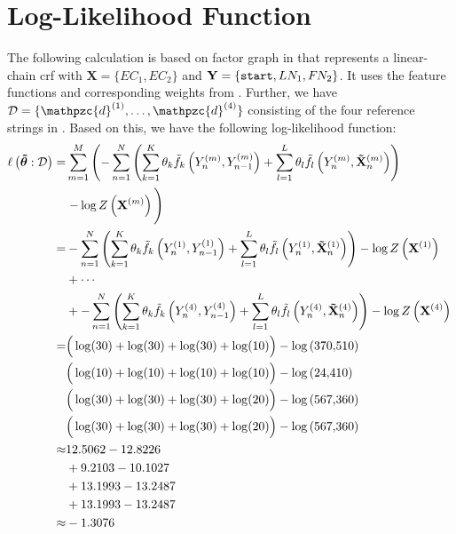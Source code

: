\section{Log-Likelihood Function}\label{app:sec-log-likelihood-function}
The following calculation is based on \gls{factor graph} in  that represents a \gls{linear-chain crf} with $\mathbf{X}=\{EC_1,EC_2\}$ and $\mathbf{Y}=\{\texttt{start},LN_1,F\hspace{-0.07em} N_2\}$.
It uses the \glspl{feature function} and corresponding weights from .
Further, we have $\mathcal{D}=\{\mathpzc{d}^{(1)},\dots,\mathpzc{d}^{(4)}\}$ consisting of the four reference strings in .
Based on this, we have the following log-likelihood function:
\begin{equation*}
  \begin{split}
    \ell\left(\bm{\tilde{\theta}}:\mathcal{D}\right) = & \sum_{m=1}^M \left(-\sum_{n=1}^N \left(\sum_{k=1}^K\theta_k \tilde{f}_k\left(Y_n^{(m)},Y_{n-1}^{(m)}\right)+\sum_{l=1}^L\theta_l \tilde{f}_l\left(Y_n^{(m)},\mathbf{\tilde{X}}_n^{(m)}\right)\right)\right. \\
    &\left.-\log Z\left(\mathbf{X}^{(m)}\right)\vphantom{\sum_{l=1}^L}\right)\\
    =&-\sum_{n=1}^N \left(\sum_{k=1}^K\theta_k \tilde{f}_k\left(Y_n^{(1)},Y_{n-1}^{(1)}\right)+\sum_{l=1}^L\theta_l \tilde{f}_l\left(Y_n^{(1)},\mathbf{\tilde{X}}_n^{(1)}\right)\right)-\log Z\left(\mathbf{X}^{(1)}\right)\vphantom{\sum_{l=1}^L}\\
    &+\cdots\\
    &+-\sum_{n=1}^N \left(\sum_{k=1}^K\theta_k \tilde{f}_k\left(Y_n^{(4)},Y_{n-1}^{(4)}\right)+\sum_{l=1}^L\theta_l \tilde{f}_l\left(Y_n^{(4)},\mathbf{\tilde{X}}_n^{(4)}\right)\right)-\log Z\left(\mathbf{X}^{(4)}\right)\vphantom{\sum_{l=1}^L}\\
    =&\Big(\log(30)+\log(30)+\log(30)+\log(10)\Big)-\log\left(\num{370510}\right)\\
    &\Big(\log(10)+\log(10)+\log(10)+\log(10)\Big)-\log\left(\num{24410}\right)\\
    &\Big(\log(30)+\log(30)+\log(30)+\log(20)\Big)-\log\left(\num{567360}\right)\\
    &\Big(\log(30)+\log(30)+\log(30)+\log(20)\Big)-\log\left(\num{567360}\right)\\
    \approx&12.5062-12.8226\\
    &+9.2103-10.1027\\
    &+13.1993-13.2487\\
    &+13.1993-13.2487\\
    \approx&-1.3076
 \end{split}
\end{equation*}
